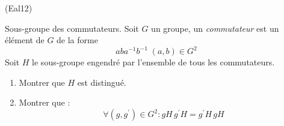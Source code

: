 \begin{tiny}(Eal12)\end{tiny} Sous-groupe des commutateurs.\newline
Soit $G$ un groupe, un \emph{commutateur} est un élément de $G$ de la forme
\begin{displaymath}
 aba^{-1}b^{-1}\; (a,b)\in G^2
\end{displaymath}
Soit $H$ le sous-groupe engendré par l'ensemble de tous les commutateurs.
\begin{enumerate}
 \item Montrer que $H$ est distingué.
 \item Montrer que :
\begin{displaymath}
 \forall (g,g^\prime)\in G^2 : gH\,g^\prime H = g^\prime H\,gH 
\end{displaymath}

\end{enumerate}